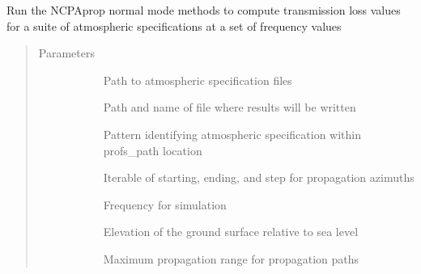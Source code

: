 \documentclass[letterpaper,10pt,english]{sphinxmanual}
\begin{document}
\begin{fulllineitems}
\label{\detokenize{stochprop.propagation:stochprop.propagation.run_modess}}
Run the NCPAprop normal mode methods to compute transmission
loss values for a suite of atmospheric specifications at
a set of frequency values
\begin{quote}\begin{description}
\item[{Parameters}] \leavevmode\begin{description}
\item[{}] \leavevmode
Path to atmospheric specification files

\item[{}] \leavevmode
Path and name of file where results will be written

\item[{}] \leavevmode
Pattern identifying atmospheric specification within profs\_path location

\item[{}] \leavevmode
Iterable of starting, ending, and step for propagation azimuths

\item[{}] \leavevmode
Frequency for simulation

\item[{}] \leavevmode
Elevation of the ground surface relative to sea level

\item[{}] \leavevmode
Maximum propagation range for propagation paths

\end{description}

\end{description}\end{quote}

\end{fulllineitems}
\end{document}
